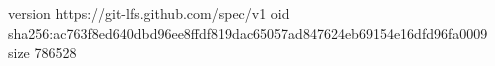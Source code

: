 version https://git-lfs.github.com/spec/v1
oid sha256:ac763f8ed640dbd96ee8ffdf819dac65057ad847624eb69154e16dfd96fa0009
size 786528
